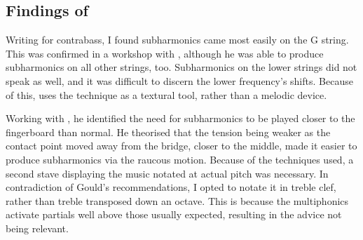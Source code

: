 \subsection{Findings of \bassPiece}
Writing for contrabass, I found subharmonics came most easily on the G string. 
This was confirmed in a workshop with \bassParticipant, although he was able to produce subharmonics on all other strings, too.
Subharmonics on the lower strings did not speak as well, and it was difficult to discern the lower frequency's shifts.
Because of this, \bassPiece\space uses the technique as a textural tool, rather than a melodic device.

Working with \bassParticipant, he identified the need for subharmonics to be played closer to the fingerboard than normal.
He theorised that the tension being weaker as the contact point moved away from the bridge, closer to the middle, made it easier to produce subharmonics via the raucous motion.\autocite[]{bloggsFeedbackContrabassSession2019}
Because of the techniques used, a second stave displaying the music notated at actual pitch was necessary.
In contradiction of Gould's recommendations, I opted to notate it in treble clef, rather than treble transposed down an octave.\autocite[423]{gouldBars2011}
This is because the multiphonics activate partials well above those usually expected, resulting in the advice not being relevant.




